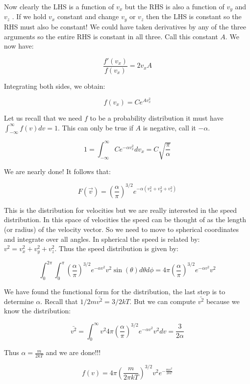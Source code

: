 \documentclass[12pt]{book}
\begin{document}
Now clearly the LHS is a function of $v_x$ but the RHS is also a function of $v_y$ and $v_z$ . If we hold $v_x$ constant and change $v_y$ or $v_z$ then the LHS is constant so the RHS must also be constant! We could have taken derivatives by any of the three arguments so the entire RHS is constant in all three. Call this constant $A.$ We now have:

\begin{equation*}
 \frac{f'(v_x)}{f(v_x)} = 2 v_x A
\end{equation*}

Integrating both sides, we obtain:

\begin{equation*}
 f(v_x) = C e^{Av_x^2}
\end{equation*}

Let us recall that we need $f$ to be a probability distribution it must have $\int_{-\infty}^\infty f(v) dv = 1.$ This can only be true if $A$ is negative, call it $-\alpha$.

\begin{equation*}
 1 = \int_{-\infty}^\infty C e^{-\alpha v_x^2} dv_x = C \sqrt{\frac{\pi}{\alpha}}
\end{equation*}

We are nearly done! It follows that:

\begin{equation*}
 F(\vec{v}) = \left(\frac{\alpha}{\pi}\right)^{3/2}e^{-\alpha(v_x^2+v_y^2+v_z^2)}
\end{equation*}

This is the distribution for velocities but we are really interested in the speed distribution. In this space of velocities the speed can be thought of as the length (or radius) of the velocity vector. So we need to move to spherical coordinates and integrate over all angles. In spherical the speed is related by: $v^2 = v_x^2 + v_y^2 + v_z^2$. Thus the speed distribution is given by:

\begin{equation*}
 \int_0^{2\pi} \int_0^\pi \left(\frac{\alpha}{\pi}\right)^{3/2}e^{-\alpha v^2}v^2\sin(\theta)d\theta d\phi = 4\pi \left(\frac{\alpha}{\pi}\right)^{3/2}e^{-\alpha v^2}v^2
\end{equation*}

We have found the functional form for the distribution, the last step is to determine $\alpha.$ Recall that
$1/2 m \bar{v^2} = 3/2kT$. But we can compute $\bar{v^2}$ because we know the distribution:

\begin{equation*}
 \bar{v^2} = \int_0^\infty v^2 4\pi \left(\frac{\alpha}{\pi}\right)^{3/2}e^{-\alpha v^2}v^2 dv = \frac{3}{2\alpha}
\end{equation*}

Thus $\alpha = \frac{m}{2kT}$ and we are done!!!

\begin{equation*}
 f(v) = 4\pi \left(\frac{m}{2\pi k T}\right)^{3/2}v^2 e^{-\frac{mv^2}{2 kT}}
\end{equation*}
\end{document}
